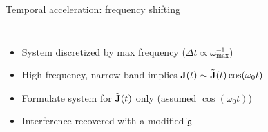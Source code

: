 \documentclass[aspectratio=169, usenames, dvipsnames]{beamer}
\begin{document}
\begin{frame}{Temporal acceleration: frequency shifting}
  \begin{columns}
      \begin{itemize}
        \item System discretized by max frequency ($\Delta t \propto \omega_\text{max}^{-1}$)
        \item High frequency, narrow band implies $\vb{J}(t) \sim \tilde{\vb{J}}(t)\cos(\omega_0 t)$
        \item Formulate system for $\tilde{\vb{J}}(t)$ only (assumed $\cos(\omega_0 t)$)
        \item Interference recovered with a modified $\tilde{\mathfrak{g}}$
      \end{itemize}

      \vspace{0.5cm}
      
  \end{columns}
\end{frame}
\end{document}
